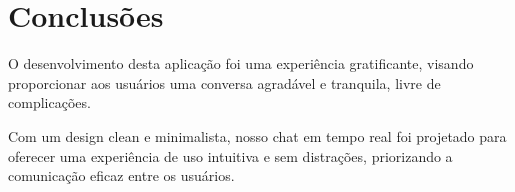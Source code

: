 \chapter{Conclusões}
\label{ch:conclusao}
	O desenvolvimento desta aplicação foi uma experiência gratificante, visando proporcionar aos usuários uma conversa agradável e tranquila, livre de complicações.

Com um design clean e minimalista, nosso chat em tempo real foi projetado para oferecer uma experiência de uso intuitiva e sem distrações, priorizando a comunicação eficaz entre os usuários.

